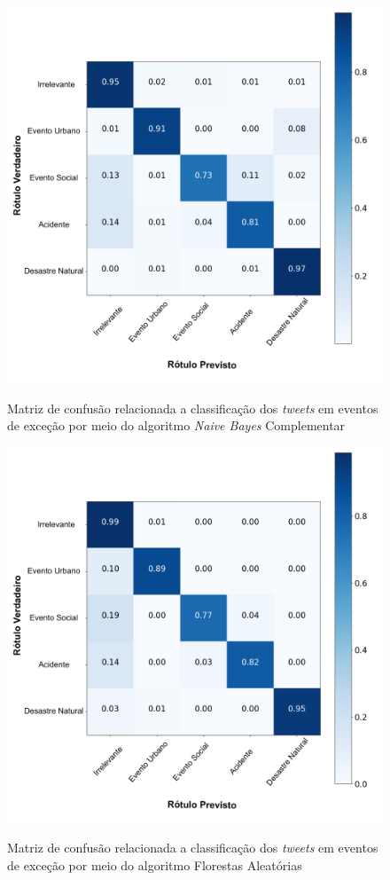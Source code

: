 \documentclass[
	12pt,				%
	oneside,			%
	a4paper,			%
	english,			%
	brazil				%
	]{abntex2ppgsi}
\begin{document}
{{{\begin{apendicesenv}
\begin{figure}[!htb]
	\centering
 	  \caption{Matriz de confusão relacionada a classificação dos \textit{tweets} em eventos de exceção por meio do algoritmo \textit{Naive Bayes} Complementar}
		\includegraphics[width=1\linewidth]{images/confusion_matrix_cnb_pt.png}
	\label{fig:confusion_matrix_gnb}
\end{figure}

\begin{figure}[!htb]
	\centering
 	  \caption{Matriz de confusão relacionada a classificação dos \textit{tweets} em eventos de exceção por meio do algoritmo Florestas Aleatórias}
		\includegraphics[width=1\linewidth]{images/confusion_matrix_rf_pt.png}
	\label{fig:confusion_matrix_rf}
\end{figure}


\end{apendicesenv}}}}
\end{document}

